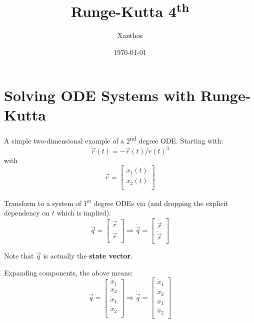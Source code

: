 \documentclass[12pt,a4paper,twoside]{report}
\title{Runge-Kutta 4\textsuperscript{th}}
\author{Xanthos}
\date{\today}
\begin{document}
\begin{titlepage}
\maketitle
\end{titlepage}


\section{Solving ODE Systems with Runge-Kutta}
A simple two-dimensional example of a 2\textsuperscript{nd} degree ODE.
Starting with:
\begin{equation}
  \label{eq:orgode}
  \ddot{\vec{r}}(t) = - \vec{r}(t) / {r(t)}^3
\end{equation}
with
\begin{equation}
  \vec{r} = 
  \begin{bmatrix}
  x_{1}(t) \\
  x_{2}(t) \\
  \end{bmatrix}
\end{equation}

Transform to a system of 1\textsuperscript{st} degree ODEs via (and dropping the 
explicit dependency on \(t\) which is implied):
\begin{equation}
  \vec{q} = 
  \begin{bmatrix}
    \vec{r} \\
    \dot{\vec{r}} \\
  \end{bmatrix}
\Rightarrow
  \dot{\vec{q}} = 
  \begin{bmatrix}
    \dot{\vec{r}} \\
    \ddot{\vec{r}} \\
  \end{bmatrix}
\end{equation}

Note that \( \vec{q} \) is actually the \textbf{state vector}.

Expanding components, the above means:
\begin{equation}
  \vec{q} = 
  \begin{bmatrix}
    x_1 \\
    x_2 \\
    \dot{x}_1 \\
    \dot{x}_2 \\
  \end{bmatrix}
\Rightarrow
  \dot{\vec{q}} = 
  \begin{bmatrix}
    \dot{x}_1 \\
    \dot{x}_2 \\
    \ddot{x}_1 \\
    \ddot{x}_2 \\
  \end{bmatrix}
\end{equation}
\end{document}
